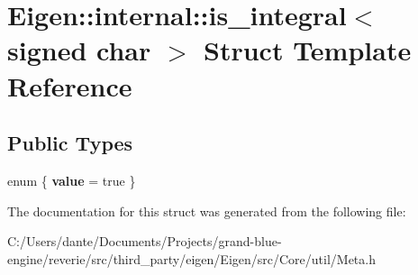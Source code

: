 \hypertarget{struct_eigen_1_1internal_1_1is__integral_3_01signed_01char_01_4}{}\section{Eigen\+::internal\+::is\+\_\+integral$<$ signed char $>$ Struct Template Reference}
\label{struct_eigen_1_1internal_1_1is__integral_3_01signed_01char_01_4}
\subsection*{Public Types}
\begin{DoxyCompactItemize}
\item 
\mbox{\label{struct_eigen_1_1internal_1_1is__integral_3_01signed_01char_01_4_a64b136dea107fffbae327381b1a9de36}} 
enum \{ {\bfseries value} = true
 \}
\end{DoxyCompactItemize}


The documentation for this struct was generated from the following file\+:\begin{DoxyCompactItemize}
\item 
C\+:/\+Users/dante/\+Documents/\+Projects/grand-\/blue-\/engine/reverie/src/third\+\_\+party/eigen/\+Eigen/src/\+Core/util/Meta.\+h\end{DoxyCompactItemize}

